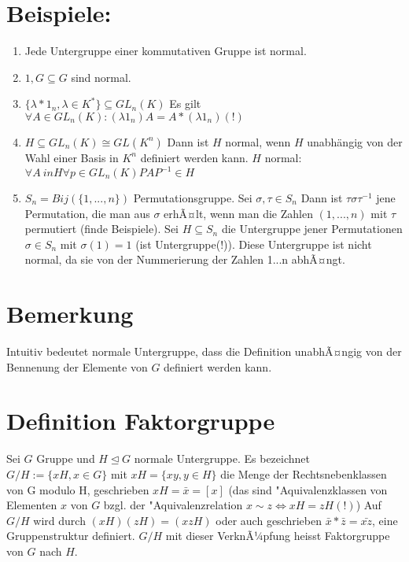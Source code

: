 \documentclass[12pt,a4paper,ngerman]{scrreprt}
\begin{document}
\section{Beispiele:}
\begin{enumerate}[(1)]
\item Jede Untergruppe einer kommutativen Gruppe ist normal.
\item $1,G \subseteq G$ sind normal.
\item $\{\lambda * 1_n, \lambda \in K^* \} \subseteq GL_n(K)$
Es gilt $\forall A \in GL_n(K) : (\lambda 1_n) A = A*(\lambda 1_n) (!)$
\item $H \subseteq GL_n(K) \cong GL(K^n)$ Dann ist $H$ normal, wenn $H$ unabhängig von der Wahl einer Basis in $K^n$ definiert werden kann.
$H$ normal: $\forall A \ in H \forall p \in GL_n(K) PAP^{-1} \in H$
\item $S_n = Bij(\{1, ... ,n\})$ Permutationsgruppe. Sei $\sigma, \tau \in S_n$ 
Dann ist $\tau \sigma \tau ^{-1}$ jene Permutation, die man aus $\sigma$ erhÃ¤lt, wenn man die Zahlen $(1, ... ,n)$ mit $\tau$ permutiert (finde Beispiele).
Sei $H \subseteq S_n$ die Untergruppe jener Permutationen $\sigma \in S_n$ mit $\sigma (1) = 1$ (ist Untergruppe(!)).
Diese Untergruppe ist nicht normal, da sie von der Nummerierung der Zahlen 1...n abhÃ¤ngt.
\end{enumerate}

\section{Bemerkung}
Intuitiv bedeutet normale Untergruppe, dass die Definition unabhÃ¤ngig von der Bennenung der Elemente von $G$ definiert werden kann.

\section{Definition Faktorgruppe}
Sei $G$ Gruppe und $H \trianglelefteq G$ normale Untergruppe. 
Es bezeichnet $G/H := \{xH, x\in G\}$ mit $xH=\{xy, y\in H\}$ die Menge der Rechtsnebenklassen von G modulo H, geschrieben $xH = \bar{x} = [x]$
(das sind "Aquivalenzklassen von Elementen $x$ von $G$ bzgl. der "Aquivalenzrelation $x \sim z \Leftrightarrow xH=zH (!)$)
Auf $G/H$ wird durch $(xH)(zH) = (xzH)$ oder auch geschrieben $\bar{x} *\bar{z} = \bar{xz}$, eine Gruppenstruktur definiert.
$G/H$ mit dieser VerknÃ¼pfung heisst Faktorgruppe von $G$ nach $H$.
\end{document}
